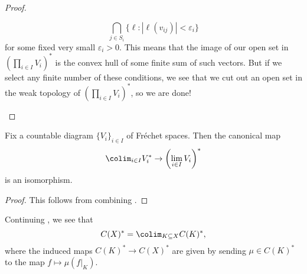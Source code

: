 \documentclass[notes.tex]{subfiles}
\begin{document}
\begin{proof}
\begin{itemize}
		\[\bigcap_{j\in S_i}\{\ell:\left|\ell(v_{ij})\right|<\varepsilon_i\}\]
		for some fixed very small $\varepsilon_i>0$. This means that the image of our open set in $\left(\prod_{i\in I}V_i\right)^*$ is the convex hull of some finite sum of such vectors. But if we select any finite number of these conditions, we see that we cut out an open set in the weak topology of $\left(\prod_{i\in I}V_i\right)^*$, so we are done!
		\qedhere
	\end{itemize}
\end{proof}
\begin{proposition}
	Fix a countable diagram $\{V_i\}_{i\in I}$ of Fr\'echet spaces. Then the canonical map
	\[\colim_{i\in I}V_i^*\to\left(\lim_{i\in I}V_i\right)^*\]
	is an isomorphism.
\end{proposition}
\begin{proof}
	This follows from combining .
\end{proof}
\begin{example} \label{ex:c-x-as-colim}
	Continuing , we see that
	\[C(X)^*=\colim_{K\subseteq X}C(K)^*,\]
	where the induced maps $C(K)^*\to C(X)^*$ are given by sending $\mu\in C(K)^*$ to the map $f\mapsto\mu(f|_K)$.
\end{example}
\end{document}
